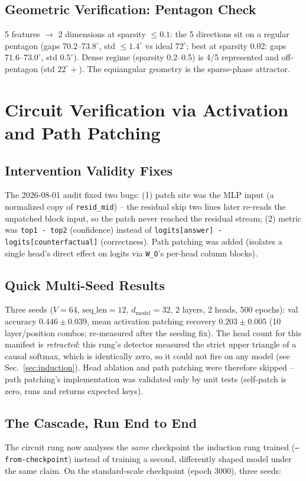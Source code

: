 \documentclass[11pt]{article}
\begin{document}
\subsection{Geometric Verification: Pentagon Check}
5 features $\to$ 2 dimensions at sparsity $\le 0.1$: the 5 directions
sit on a regular pentagon (gaps $70.2\text{--}73.8^\circ$, std
$\le 1.4^\circ$ vs ideal $72^\circ$; best at sparsity 0.02: gaps
$71.6\text{--}73.0^\circ$, std $0.5^\circ$). Dense regime (sparsity
0.2--0.5) is 4/5 represented and off-pentagon (std $22^\circ+$). The
equiangular geometry is the sparse-phase attractor.

\section{Circuit Verification via Activation and Path Patching}
\label{sec:patching}

\subsection{Intervention Validity Fixes}
The 2026-08-01 audit fixed two bugs: (1) patch site was the MLP input
(a normalized copy of \texttt{resid\_mid}) -- the residual skip two
lines later re-reads the unpatched block input, so the patch never
reached the residual stream; (2) metric was \texttt{top1 - top2}
(confidence) instead of \texttt{logits[answer] - logits[counterfactual]}
(correctness). Path patching was added (isolates a single head's direct
effect on logits via \texttt{W\_O}'s per-head column blocks).

\subsection{Quick Multi-Seed Results}
Three seeds ($V=64$, $\text{seq\_len}=12$, $d_\text{model}=32$, 2 layers,
2 heads, 500 epochs): val accuracy $0.446 \pm 0.039$, mean activation
patching recovery $0.203 \pm 0.005$ (10 layer/position combos; re-measured after the seeding fix).
The head count for this manifest is \emph{retracted}: this rung's
detector measured the strict upper triangle of a causal softmax, which is
identically zero, so it could not fire on any model (see
Sec.~\ref{sec:induction}). Head ablation and path patching were therefore
skipped -- path patching's implementation was validated only by unit tests
(self-patch is zero, runs and returns expected keys).

\subsection{The Cascade, Run End to End}
The circuit rung now analyses the \emph{same} checkpoint the induction rung
trained (\texttt{--from-checkpoint}) instead of training a second, differently
shaped model under the same claim. On the standard-scale checkpoint (epoch
3000), three seeds:
\end{document}
